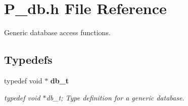 \section{P\_\-db.h File Reference}
\label{P__db_8h}
Generic database access functions. 


\subsection*{Typedefs}
\begin{CompactItemize}
\item 
typedef void $\ast$ {\bf db\_\-t}
\begin{CompactList}\small\item\em typedef void $\ast$db\_\-t; Type definition for a generic database.\item\end{CompactList}\end{CompactItemize}
